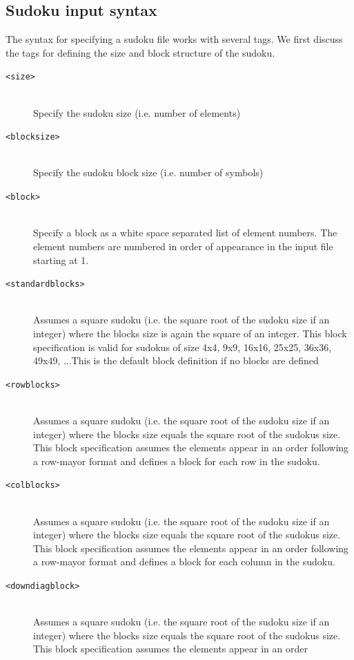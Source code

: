 \documentclass[12pt]{article}
\begin{document}
\subsection{Sudoku input syntax}
The syntax for specifying a sudoku file works with several tags. We first discuss the tags for defining the size and block structure of the sudoku.
\begin{description}
\item [\texttt{<size>}] \hfill \\ Specify the sudoku size (i.e. number of elements)
\item [\texttt{<blocksize>}] \hfill \\ Specify the sudoku block size (i.e. number of symbols)		
\item [\texttt{<block>}] \hfill \\ Specify a block as a white space separated list of element numbers. The 
element numbers are numbered in order of appearance in the input file starting at 1.
\item [\texttt{<standardblocks>}] \hfill \\ Assumes a square sudoku (i.e. the square root of the sudoku size if an 
integer) where the blocks size is again the square of an integer. 
This block specification is valid for sudokus of size 4x4, 9x9, 16x16, 
25x25, 36x36, 49x49, ...This is the default block definition if no blocks are defined 
\item [\texttt{<rowblocks>}] \hfill \\ Assumes a square sudoku (i.e. the square root of the sudoku size if an 
integer) where the blocks size equals the square root of the sudokus 
size. This block specification assumes the elements appear in an order 
following a row-mayor format and defines a block for each row in the 
sudoku. 
\item [\texttt{<colblocks>}] \hfill \\ Assumes a square sudoku (i.e. the square root of the sudoku size if an 
integer) where the blocks size equals the square root of the sudokus 
size. This block specification assumes the elements appear in an order 
following a row-mayor format and defines a block for each column in the 
sudoku. 
\item [\texttt{<downdiagblock>}] \hfill \\ Assumes a square sudoku (i.e. the square root of the sudoku size if an 
integer) where the blocks size equals the square root of the sudokus 
size. This block specification assumes the elements appear in an order 

\end{description}
\end{document}
